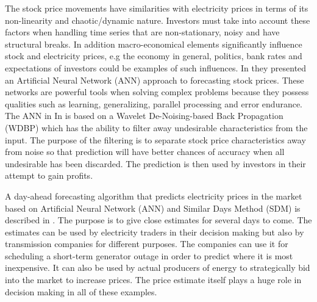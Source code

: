 The stock price movements have similarities with electricity prices in terms of its non-linearity and chaotic/dynamic nature. Investors must take into account these factors when handling time series that are non-stationary, noisy and have structural breaks. In addition macro-economical elements significantly influence stock and electricity prices, e.g the economy in general, politics, bank rates and expectations of investors could be examples of such influences. In \cite{stockForecasting} they presented an Artificial Neural Network (ANN) approach to forecasting stock prices. These networks are powerful tools when solving complex problems because they possess qualities such as learning, generalizing, parallel processing and error endurance. The ANN in In \cite{stockForecasting} is based on a Wavelet De-Noising-based Back Propagation (WDBP) which has the ability to filter away undesirable characteristics from the input. The purpose of the filtering is to separate stock price characteristics away from noise so that prediction will have better chances of accuracy when all undesirable has been discarded. The prediction is then used by investors in their attempt to gain profits. 

A day-ahead forecasting algorithm that predicts electricity prices in the market based on Artificial Neural Network (ANN) and Similar Days Method (SDM) is described in \cite{pjmForecast}. The purpose is to give close estimates for several days to come. The estimates can be used by electricity traders in their decision making but also by transmission companies for different purposes. The companies can use it for scheduling a short-term generator outage in order to predict where it is most inexpensive. It can also be used by actual producers of energy to strategically bid into the market to increase prices. The price estimate itself plays a huge role in decision making in all of these examples.

